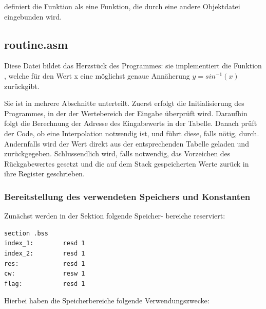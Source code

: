 \documentclass{article}
\begin{document}
\vspace{0.3cm}

	definiert die Funktion  als eine Funktion,
	die durch eine andere Objektdatei eingebunden wird.

\subsection{routine.asm}

	Diese Datei bildet das Herzstück des Programmes: sie implementiert
	die Funktion , welche für den Wert x eine 
	möglichst genaue Annäherung  
	$y = sin^{-1}(x)$ zurückgibt.

	\vspace{0.3cm}

	Sie ist in mehrere Abschnitte unterteilt. Zuerst erfolgt die
	Initialisierung des Programmes, in der der Wertebereich der
	Eingabe überprüft wird. Daraufhin folgt die Berechnung der
	Adresse des Eingabewerts in der Tabelle. Danach prüft der Code,
	ob eine Interpolation notwendig ist, und führt diese, falls nötig, durch.
	Andernfalls wird der Wert direkt aus der entsprechenden
	Tabelle geladen und zurückgegeben.
	Schlussendlich wird, falls notwendig, das Vorzeichen des
	Rückgabewertes gesetzt und die auf dem Stack gespeicherten Werte
	zurück in ihre Register geschrieben.

\subsubsection{Bereitstellung des verwendeten Speichers und Konstanten}

	Zunächst werden in der Sektion  folgende Speicher-
	bereiche reserviert:

\vspace{0.5cm}

\lstset{language=nasm, style=nasm}

\begin{lstlisting}
section .bss
index_1:        resd 1
index_2:        resd 1
res:            resd 1
cw:             resw 1
flag:           resd 1
\end{lstlisting}

\vspace{0.5cm}

	Hierbei haben die Speicherbereiche folgende Verwendungszwecke:
\end{document}
